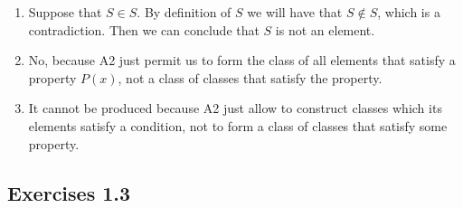 \documentclass{article}
\begin{document}
\begin{enumerate}
		\item[8.] Suppose that $S \in S$. By definition of $S$ we will have that $S \notin S$, which is a contradiction. Then we can conclude that $S$ is not an element.
		
		\item[9.] No, because A2 just permit us to form the class of all elements that satisfy a property $P(x)$, not a class of classes that satisfy the property.
		
		\item[10.] It cannot be produced because A2 just allow to construct classes which its elements satisfy a condition, not to form a class of classes that satisfy some property.
	\end{enumerate}

\subsection*{Exercises 1.3}

	
\end{document}
